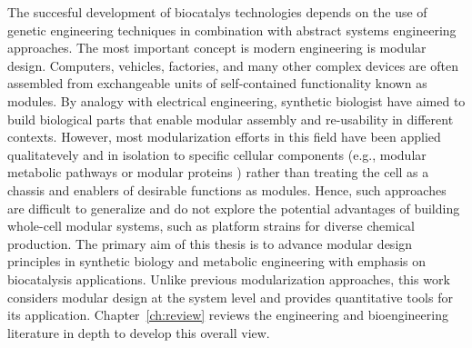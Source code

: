 The succesful development of biocatalys technologies depends on the use of genetic engineering techniques in combination with abstract systems engineering approaches.
The most important concept is modern engineering is modular design. Computers, vehicles, factories, and many other complex devices are often assembled from exchangeable units of self-contained functionality known as modules.
By analogy with electrical engineering, synthetic biologist have aimed to build biological parts that enable modular assembly and re-usability in different contexts.
However, most modularization efforts in this field have been applied qualitatevely and in isolation to specific cellular components (e.g., modular metabolic pathways \citep{biggs2014} or modular proteins \citep{maervoet2017}) rather than treating the cell as a chassis and enablers of desirable functions as modules. %
Hence, such approaches are difficult to generalize and do not explore the potential advantages of building whole-cell modular systems, such as platform strains for diverse chemical production.
The primary aim of this thesis is to advance modular design principles in synthetic biology and metabolic engineering with emphasis on biocatalysis applications.
Unlike previous modularization approaches, this work considers modular design at the system level and provides quantitative tools for its application.
Chapter~\ref{ch:review} reviews the engineering and bioengineering literature in depth to develop this overall view. %




